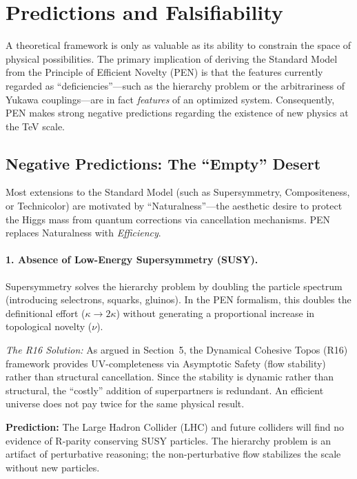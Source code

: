 \documentclass[12pt,a4paper]{article}
\theoremstyle{definition}
\newcommand{\kap}{\kappa}
\begin{document}
\section{Predictions and Falsifiability}

A theoretical framework is only as valuable as its ability to constrain the space of physical possibilities. The primary implication of deriving the Standard Model from the Principle of Efficient Novelty (PEN) is that the features currently regarded as ``deficiencies''—such as the hierarchy problem or the arbitrariness of Yukawa couplings—are in fact \emph{features} of an optimized system. Consequently, PEN makes strong negative predictions regarding the existence of new physics at the TeV scale.

\subsection{Negative Predictions: The ``Empty'' Desert}

Most extensions to the Standard Model (such as Supersymmetry, Compositeness, or Technicolor) are motivated by ``Naturalness''—the aesthetic desire to protect the Higgs mass from quantum corrections via cancellation mechanisms. PEN replaces Naturalness with \emph{Efficiency}.

\paragraph{1. Absence of Low-Energy Supersymmetry (SUSY).}
Supersymmetry solves the hierarchy problem by doubling the particle spectrum (introducing selectrons, squarks, gluinos). In the PEN formalism, this doubles the definitional effort ($\kap \to 2\kap$) without generating a proportional increase in topological novelty ($\nu$).

\emph{The R16 Solution:} As argued in Section~5, the Dynamical Cohesive Topos (R16) framework provides UV-completeness via Asymptotic Safety (flow stability) rather than structural cancellation. Since the stability is dynamic rather than structural, the ``costly'' addition of superpartners is redundant. An efficient universe does not pay twice for the same physical result.

\textbf{Prediction:} The Large Hadron Collider (LHC) and future colliders will find no evidence of R-parity conserving SUSY particles. The hierarchy problem is an artifact of perturbative reasoning; the non-perturbative flow stabilizes the scale without new particles.
\end{document}
